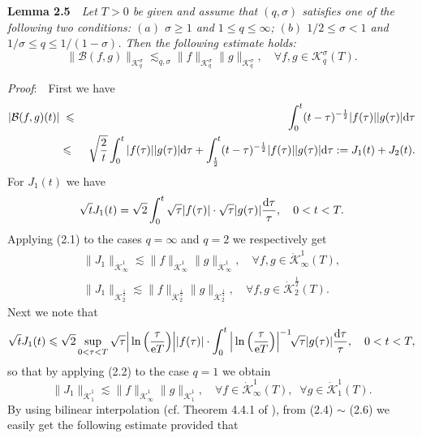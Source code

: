 \documentclass[11pt]{article}
\newcommand{\rmd}{\mbox{\rm d}}
\newcommand{\rme}{{\rm e}}
\begin{document}
  {\bf Lemma 2.5}\ \ {\em Let $T>0$ be given and assume that $(q,\sigma)$ satisfies one of the following two conditions: $(a)$ $\sigma\geqslant 1$ and
  $1\leqslant q\leqslant\infty$;  $(b)$ $1/2\leqslant\sigma<1$ and $1/\sigma\leqslant q\leqslant 1/(1\!-\!\sigma)$. Then the following estimate
  holds:}
\begin{equation}
  \|\mathcal{B}(f,g)\|_{\mathscr{K}^{\sigma}_q}\lesssim_{q,\sigma}\|f\|_{\mathscr{K}^{\sigma}_q}\|g\|_{\mathscr{K}^{\sigma}_q}, \quad
  \forall f,g\in\mathscr{K}^{\sigma}_q(T).
\end{equation}

  {\em Proof}:\ \ First we have
\begin{eqnarray*}
  |\mathcal{B}(f,g)(t)|&\;\leqslant\;&\int_0^t(t-\tau)^{-\frac{1}{2}}|f(\tau)||g(\tau)|\rmd\tau
\\
  &\leqslant&\sqrt{\frac{2}{t}}\int_0^t|f(\tau)||g(\tau)|\rmd\tau+\int_{\frac{t}{2}}^t(t-\tau)^{-\frac{1}{2}}|f(\tau)||g(\tau)|\rmd\tau
  :=J_1(t)+J_2(t).
\end{eqnarray*}
  For $J_1(t)$ we have
$$
  \sqrt{t}J_1(t)=\sqrt{2}\int_0^t\sqrt{\tau}|f(\tau)|\cdot\sqrt{\tau}|g(\tau)|\frac{\rmd\tau}{\tau}, \quad 0<t<T.
$$
  Applying (2.1) to the cases $q=\infty$ and $q=2$ we respectively get
\begin{eqnarray}
  &\|J_1\|_{\dot{\mathscr{K}}^1_{\infty}}\lesssim\|f\|_{\dot{\mathscr{K}}^1_{\infty}}\|g\|_{\dot{\mathscr{K}}^1_{\infty}}, \quad
  \forall f,g\in\dot{\mathscr{K}}^1_{\infty}(T),&
\\
  &\|J_1\|_{\dot{\mathscr{K}}^{\frac{1}{2}}_2}\lesssim\|f\|_{\dot{\mathscr{K}}^{\frac{1}{2}}_2}\|g\|_{\dot{\mathscr{K}}^{\frac{1}{2}}_2}, \quad
  \forall f,g\in\dot{\mathscr{K}}^{\frac{1}{2}}_2(T).&
\end{eqnarray}
  Next we note that
$$
  \sqrt{t}J_1(t)\leqslant\sqrt{2}\sup_{0<\tau<T}\sqrt{\tau}\Big|\ln\Big(\frac{\tau}{\rme T}\Big)\Big||f(\tau)|\cdot
  \int_0^t\Big|\ln\Big(\frac{\tau}{\rme T}\Big)\Big|^{-1}\!\sqrt{\tau}|g(\tau)|\frac{\rmd\tau}{\tau}, \quad 0<t<T,
$$
  so that by applying (2.2) to the case $q=1$ we obtain
\begin{equation}
  \|J_1\|_{\dot{\mathscr{K}}^1_1}\lesssim\|f\|_{\dot{\mathscr{K}}^1_{\infty}}\|g\|_{\dot{\mathscr{K}}^1_1}, \quad
  \forall f\in\dot{\mathscr{K}}^1_{\infty}(T),\;\; \forall g\in\dot{\mathscr{K}}^1_1(T).
\end{equation}
  By using bilinear interpolation (cf. Theorem 4.4.1 of \cite{BerLof}), from (2.4) $\sim$ (2.6) we easily get the following estimate provided that
\end{document}
